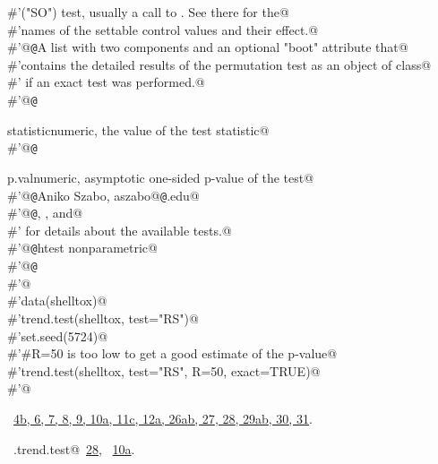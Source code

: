 \documentclass[reqno]{amsart}
\renewcommand{\NWlink}[2]{\hyperlink{#1}{#2}}
\begin{document}
\begin{flushleft}
\begin{list}{}{}
\mbox{}\verb@#'("SO") test, usually a call to .  See there for the@\\
\mbox{}\verb@#'names of the settable control values and their effect.@\\
\mbox{}\verb@#'@{\tt @}\verb@return A list with two components and an optional "boot" attribute that@\\
\mbox{}\verb@#'contains the detailed results of the permutation test as an object of class@\\
\mbox{}\verb@#' if an exact test was performed.@\\
\mbox{}\verb@#'@{\tt @}\verb@return \item{statistic}{numeric, the value of the test statistic}@\\
\mbox{}\verb@#'@{\tt @}\verb@return \item{p.val}{numeric, asymptotic one-sided p-value of the test}@\\
\mbox{}\verb@#'@{\tt @}\verb@author Aniko Szabo, aszabo@{\tt @}\verb@mcw.edu@\\
\mbox{}\verb@#'@{\tt @}\verb@seealso {}, , and@\\
\mbox{}\verb@#' for details about the available tests.@\\
\mbox{}\verb@#'@{\tt @}\verb@keywords htest nonparametric@\\
\mbox{}\verb@#'@{\tt @}\verb@examples@\\
\mbox{}\verb@#'@\\
\mbox{}\verb@#'data(shelltox)@\\
\mbox{}\verb@#'trend.test(shelltox, test="RS")@\\
\mbox{}\verb@#'set.seed(5724)@\\
\mbox{}\verb@#'#R=50 is too low to get a good estimate of the p-value@\\
\mbox{}\verb@#'trend.test(shelltox, test="RS", R=50, exact=TRUE)@\\
\mbox{}\verb@#'@\\
\mbox{}\verb@@{\NWsep}
\end{list}
\vspace{-1.5ex}
\footnotesize
\begin{list}{}{\setlength{\itemsep}{-\parsep}\setlength{\itemindent}{-\leftmargin}}
\item \NWtxtFileDefBy\ \NWlink{nuweb4b}{4b}\NWlink{nuweb6}{, 6}\NWlink{nuweb7}{, 7}\NWlink{nuweb8}{, 8}\NWlink{nuweb9}{, 9}\NWlink{nuweb10a}{, 10a}\NWlink{nuweb11c}{, 11c}\NWlink{nuweb12a}{, 12a}\NWlink{nuweb26a}{, 26a}\NWlink{nuweb26b}{b}\NWlink{nuweb27}{, 27}\NWlink{nuweb28}{, 28}\NWlink{nuweb29a}{, 29a}\NWlink{nuweb29b}{b}\NWlink{nuweb30}{, 30}\NWlink{nuweb31}{, 31}.
\item \NWtxtIdentsUsed\nobreak\  \verb@SO.trend.test@\nobreak\ \NWlink{nuweb28}{28}, \verb@soControl@\nobreak\ \NWlink{nuweb10a}{10a}.
\item{}
\end{list}
\vspace{4ex}
\end{flushleft}
\end{document}
